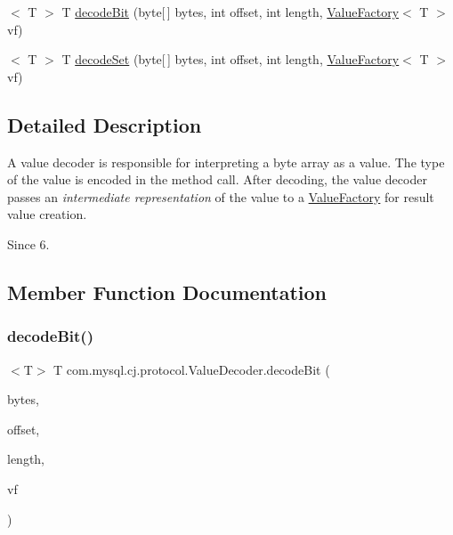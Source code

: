 \begin{DoxyCompactItemize}
\item 
$<$ T $>$ T \mbox{\hyperlink{interfacecom_1_1mysql_1_1cj_1_1protocol_1_1_value_decoder_a200033b8cceea3e29c1025302861d5a2}{decode\+Bit}} (byte\mbox{[}$\,$\mbox{]} bytes, int offset, int length, \mbox{\hyperlink{interfacecom_1_1mysql_1_1cj_1_1result_1_1_value_factory}{Value\+Factory}}$<$ T $>$ vf)
\item 
$<$ T $>$ T \mbox{\hyperlink{interfacecom_1_1mysql_1_1cj_1_1protocol_1_1_value_decoder_a9bfce5e392167ea482dc9b64ea235c43}{decode\+Set}} (byte\mbox{[}$\,$\mbox{]} bytes, int offset, int length, \mbox{\hyperlink{interfacecom_1_1mysql_1_1cj_1_1result_1_1_value_factory}{Value\+Factory}}$<$ T $>$ vf)
\end{DoxyCompactItemize}


\subsection{Detailed Description}
A value decoder is responsible for interpreting a byte array as a value. The type of the value is encoded in the method call. After decoding, the value decoder passes an {\itshape intermediate representation} of the value to a \mbox{\hyperlink{}{Value\+Factory}} for result value creation.

\begin{DoxySince}{Since}
6. 
\end{DoxySince}


\subsection{Member Function Documentation}
\mbox{\label{interfacecom_1_1mysql_1_1cj_1_1protocol_1_1_value_decoder_a200033b8cceea3e29c1025302861d5a2}} 
\subsubsection{\texorpdfstring{decode\+Bit()}{decodeBit()}}
{\footnotesize\ttfamily $<$T$>$ T com.\+mysql.\+cj.\+protocol.\+Value\+Decoder.\+decode\+Bit (\begin{DoxyParamCaption}\item[{byte \mbox{[}$\,$\mbox{]}}]{bytes,  }\item[{int}]{offset,  }\item[{int}]{length,  }\item[{\mbox{\hyperlink{interfacecom_1_1mysql_1_1cj_1_1result_1_1_value_factory}{Value\+Factory}}$<$ T $>$}]{vf }\end{DoxyParamCaption})}

